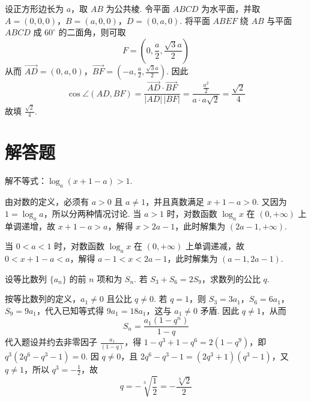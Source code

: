 \begin{solution}
设正方形边长为 \(a\)，取 \(AB\) 为公共棱. 令平面 \(ABCD\) 为水平面，并取
\(A=(0,0,0)\)，\(B=(a,0,0)\)，\(D=(0,a,0)\).
将平面 \(ABEF\) 绕 \(AB\) 与平面 \(ABCD\) 成 \(60^{\circ}\) 的二面角，则可取
\[
F=\left(0,\frac{a}{2},\frac{\sqrt{3}a}{2}\right)
\]
从而 \(\overrightarrow{AD}=(0,a,0)\)，\(\overrightarrow{BF}=\left(-a,\frac{a}{2},\frac{\sqrt{3}a}{2}\right)\). 因此
\[
\cos\angle(AD,BF)=\frac{\overrightarrow{AD}\cdot\overrightarrow{BF}}{|AD|\,|BF|}
=\frac{\frac{a^2}{2}}{a\cdot a\sqrt{2}}=\frac{\sqrt{2}}{4}
\]
故填 \(\frac{\sqrt{2}}{4}\).
\end{solution}

\section{解答题}

\begin{problem}
解不等式：\(\log_a(x + 1 - a) > 1\).
\end{problem}

\begin{solution}
由对数的定义，必须有 \(a>0\) 且 \(a\ne1\)，并且真数满足 \(x+1-a>0\). 又因为 \(1=\log_a a\)，所以分两种情况讨论. 当 \(a>1\) 时，对数函数 \(\log_a x\) 在 \((0,+\infty)\) 上单调递增，故 \(x+1-a>a\)，解得 \(x>2a-1\)，此时解集为 \(\left(2a-1,+\infty\right)\).

当 \(0<a<1\) 时，对数函数 \(\log_a x\) 在 \((0,+\infty)\) 上单调递减，故 \(0<x+1-a<a\)，解得 \(a-1<x<2a-1\)，此时解集为 \(\left(a-1,2a-1\right)\).
\end{solution}

\begin{problem}
设等比数列 \(\{a_{n}\}\) 的前 \(n\) 项和为 \(S_{n}\). 若 \(S_{3} + S_{6} = 2S_{9}\)，求数列的公比 \(q\).
\end{problem}

\begin{solution}
按等比数列的定义，\(a_{1}\ne0\) 且公比 \(q\ne0\). 若 \(q=1\)，则 \(S_{3}=3a_{1}\)，\(S_{6}=6a_{1}\)，\(S_{9}=9a_{1}\)，代入已知等式得 \(9a_{1}=18a_{1}\)，这与 \(a_{1}\ne0\) 矛盾. 因此 \(q\ne1\)，从而
\[
S_n=\frac{a_1\left(1-q^n\right)}{1-q}
\]
代入题设并约去非零因子 \(\frac{a_1}{(1-q)}\)，得 \(1-q^3+1-q^6=2\left(1-q^9\right)\)，即 \(q^3\left(2q^6-q^3-1\right)=0\). 因 \(q\ne0\)，且 \(2q^6-q^3-1=\left(2q^3+1\right)\left(q^3-1\right)\)，又 \(q\ne1\)，所以 \(q^3=-\frac{1}{2}\)，故
\[
q=-\sqrt[3]{\frac{1}{2}}=-\frac{\sqrt[3]{2}}{2}
\]
\end{solution}

